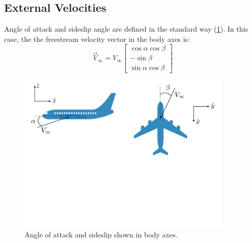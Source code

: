 \documentclass{article}
\begin{document}
\subsection{External Velocities}

Angle of attack and sideslip angle are defined in the standard way (\cref{fig:alphabeta2}).  In this case, the the freestream velocity vector in the body axes is: 
\begin{equation}
    \vec{V}_{\infty} = V_\infty
    \begin{bmatrix}
    \cos\alpha\cos\beta\\
    -\sin\beta\\
    \sin\alpha\cos\beta
    \end{bmatrix}
\end{equation}

\begin{figure}[htbp]
\centering
\includegraphics[width=4.0in]{figs/alphabeta2}
\caption{Angle of attack and sideslip shown in body axes.}
\label{fig:alphabeta2}
\end{figure}
\end{document}
